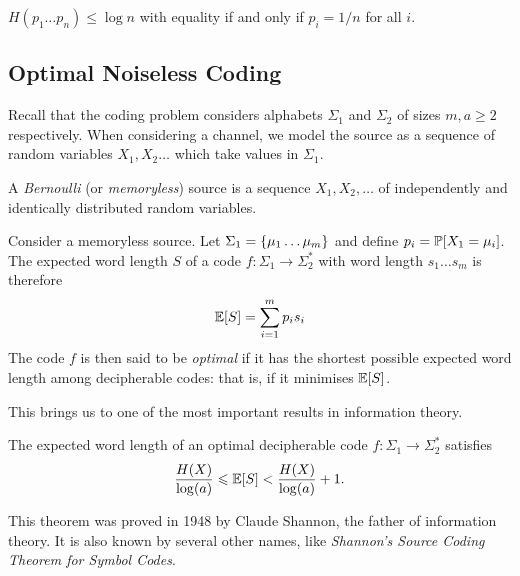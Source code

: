 \documentclass{article}
\begin{document}
\begin{corollary}
    $H(p_1 \dots p_n) \leq \log n$ with equality if and only if $p_i = 1/n$ for all $i$.
\end{corollary}


\subsection{Optimal Noiseless Coding}

Recall that the coding problem considers alphabets $\Sigma_1$ and $\Sigma_2$ of sizes $m, a \geq 2$ respectively. When considering a channel, we model the source as a sequence of random variables $X_1, X_2 \dots$ which take values in $\Sigma_1$.

\begin{definition}
	\label{memoryless-source}
    A \textit{Bernoulli} (or \textit{memoryless}) source is a sequence $X_1, X_2, \dots$ of independently and identically distributed random variables.
\end{definition}

\begin{definition}
	\label{optimal-code}
    Consider a memoryless source. Let $\Sigma_1 = \set{\mu_1 \dots \mu_m}$ and define $p_i = \P[X_1 = \mu_i]$. The expected word length $S$ of a code $f : \Sigma_1 \to \Sigma_2^*$ with word length $s_1 \dots s_m$ is therefore
	\[
	\E[S] = \sum_{i=1}^m p_i s_i
	\]
	The code $f$ is then said to be \textit{optimal} if it has the shortest possible expected word length among decipherable codes: that is, if it minimises $\E[S]$.
\end{definition}

This brings us to one of the most important results in information theory.

\begin{theorem}
	\label{shannon-noiseless-coding-theorem}
    The expected word length of an optimal decipherable code $f: \Sigma_1 \to \Sigma_2^*$ satisfies
    \[
	\frac{H(X)}{\log (a)} \leq \E[S] < \frac{H(X)}{\log (a)} + 1.
	\]
\end{theorem}

This theorem was proved in 1948 by Claude Shannon, the father of information theory. It is also known by several other names, like \textit{Shannon's Source Coding Theorem for Symbol Codes}.
\end{document}

